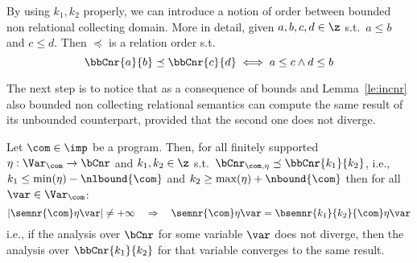 By using \(k_1, k_2\) properly, we can introduce a notion of order
between bounded non relational collecting domain. More in detail,
given \(a,b,c,d \in \z\) s.t.\ \(a\leq b\) and \(c \leq d\). Then
\(\preceq\) is a relation order s.t.
\begin{equation*}
  \bbCnr{a}{b} \preceq \bbCnr{c}{d} \iff a \leq c \land d \leq b
\end{equation*}

The next step is to notice that as a consequence of bounds and
Lemma~\ref{le:incnr} also bounded non collecting relational semantics
can compute the same result of its unbounded counterpart, provided
that the second one does not diverge.

\begin{theorem}
  Let \(\com\in\imp\) be a program. Then, for all finitely supported
  \(\eta : \Var_{\com} \to \bCnr\) and \(k_1, k_2 \in \z\) s.t.\
  \(\bCnr_{\com,\eta} \preceq \bbCnr{k_1}{k_2}\), i.e.,
  \(k_1 \leq \min(\eta) - \nlbound{\com}\) and
  \(k_2 \geq \max(\eta) + \nbound{\com}\) then for all
  \(\var\in\Var_{\com}\):
  \begin{equation*}
    |\semnr{\com}\eta\var| \neq +\infty \quad \Rightarrow \quad \semnr{\com}\eta\var = \bsemnr{k_1}{k_2}{\com}\eta\var
  \end{equation*}
  i.e., if the analysis over \(\bCnr\) for some variable \(\var\) does
  not diverge, then the analysis over \(\bbCnr{k_1}{k_2}\) for that
  variable converges to the same result.
\end{theorem}

